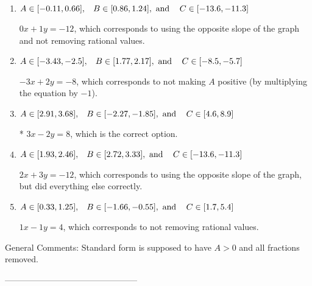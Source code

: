 \documentclass{extbook}[14pt]
\begin{document}
\begin{enumerate}[label=\Alph*.] 
\item $ A \in [-0.11, 0.66], \hspace{3mm} B \in [0.86, 1.24], \text{ and } \hspace{3mm} C \in [-13.6, -11.3] $ 

  $0x + 1y = -12$, which corresponds to using the opposite slope of the graph and not removing rational values. 
\item $ A \in [-3.43, -2.5], \hspace{3mm} B \in [1.77, 2.17], \text{ and } \hspace{3mm} C \in [-8.5, -5.7] $ 

  $-3x + 2y = -8$, which corresponds to not making $A$ positive (by multiplying the equation by $-1$). 
\item $ A \in [2.91, 3.68], \hspace{3mm} B \in [-2.27, -1.85], \text{ and } \hspace{3mm} C \in [4.6, 8.9] $ 

 * $3x - 2y = 8$, which is the correct option. 
\item $ A \in [1.93, 2.46], \hspace{3mm} B \in [2.72, 3.33], \text{ and } \hspace{3mm} C \in [-13.6, -11.3] $ 

  $2x + 3y = -12$, which corresponds to using the opposite slope of the graph, but did everything else correctly. 
\item $ A \in [0.33, 1.25], \hspace{3mm} B \in [-1.66, -0.55], \text{ and } \hspace{3mm} C \in [1.7, 5.4] $ 

  $1x - 1y = 4$, which corresponds to not removing rational values. 
\end{enumerate} 
 
General Comments: Standard form is supposed to have $A > 0$ and all fractions removed.

-----------------------------------------------
\end{document}
